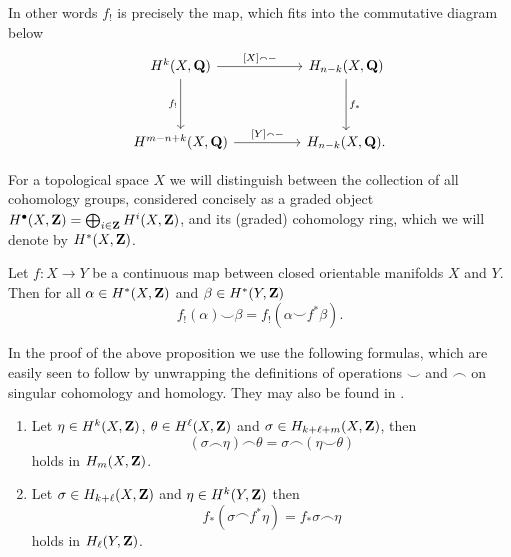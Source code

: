 \begin{remark}
    In other words $f_!$ is precisely the map, which fits into the commutative diagram below
    \[\begin{tikzcd}
        \cohom{k}{X}{\Q} && H_{n-k}(X, \Q) \\
        \\
        \cohom{m-n+k}{X}{\Q} && H_{n-k}(X, \Q).
        \arrow["{[X] \smallfrown -}", from=1-1, to=1-3]
        \arrow["{f_!}"', from=1-1, to=3-1]
        \arrow["{f_*}", from=1-3, to=3-3]
        \arrow["{[Y] \smallfrown -}", from=3-1, to=3-3]
    \end{tikzcd}\]
\end{remark}

\begin{remark}
    For a topological space $X$ we will distinguish between the collection of all cohomology groups, considered concisely as a graded object $H^{\bullet}(X, \mathbf Z) = \bigoplus_{i\in \mathbf Z} H^{i}(X, \mathbf Z)$, and its (graded) cohomology ring, which we will denote by $H^{*}(X, \mathbf Z)$.
\end{remark}

\begin{proposition}
    \label{cohomological projection formula}
    Let $f \colon X \to Y$ be a continuous map between closed orientable manifolds $X$ and $Y$. Then for all $\alpha \in H^{*}(X, \mathbf Z)$ and $\beta \in H^{*}(Y, \mathbf Z)$
    \[
        f_!(\alpha) \smallsmile \beta = f_!(\alpha \smallsmile f^*\beta).
    \]
\end{proposition}

\begin{remark}
    In the proof of the above proposition we use the following formulas, which are easily seen to follow by unwrapping the definitions of operations $\smallsmile$ and $\smallfrown$ on singular cohomology and homology. They may also be found in \cite[\S VI, Theorem 5.2]{Bredon1993}.
    \begin{enumerate}[label = (\roman*)]
        \item{Let $\eta \in H^{k}(X, \mathbf Z)$, $\theta \in H^{\ell}(X, \mathbf Z)$ and $\sigma \in H_{k+\ell+m}(X, \mathbf Z)$, then 
        \[
            (\sigma \smallfrown \eta) \smallfrown \theta = 
            \sigma \smallfrown (\eta \smallsmile \theta)
        \]
        holds in $H_m(X, \mathbf Z)$.}
        \item{Let $\sigma \in H_{k + \ell}(X, \mathbf Z)$ and $\eta \in H^{k}(Y, \mathbf Z)$ then 
        \[
            f_*(\sigma \smallfrown f^*\eta) = f_*\sigma \smallfrown \eta
        \]
        holds in $H_\ell(Y, \mathbf Z)$.
        }
    \end{enumerate}
\end{remark}

